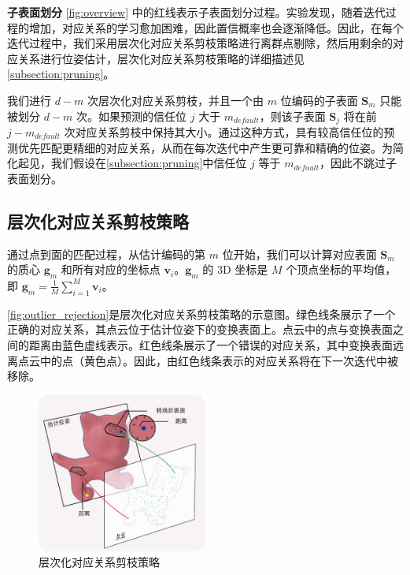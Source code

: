 \textbf{子表面划分} \autoref{fig:overview} 中的红线表示子表面划分过程。实验发现，随着迭代过程的增加，对应关系的学习愈加困难，因此置信概率也会逐渐降低。因此，在每个迭代过程中，我们采用层次化对应关系剪枝策略进行离群点剔除，然后用剩余的对应关系进行位姿估计，层次化对应关系剪枝策略的详细描述见\autoref{subsection:pruning}。

我们进行 $d - m$ 次层次化对应关系剪枝，并且一个由 $m$ 位编码的子表面 $\mathbf{S}_m$ 只能被划分 $d - m$ 次。如果预测的信任位 $j$ 大于 $m_{default}$，则该子表面 $\mathbf{S}_j$ 将在前 $j - m_{default}$ 次对应关系剪枝中保持其大小。通过这种方式，具有较高信任位的预测优先匹配更精细的对应关系，从而在每次迭代中产生更可靠和精确的位姿。为简化起见，我们假设在\autoref{subsection:pruning}中信任位 $j$ 等于 $m_{default}$，因此不跳过子表面划分。

\subsection{层次化对应关系剪枝策略}\label{subsection:pruning}

通过点到面的匹配过程，从估计编码的第 $m$ 位开始，我们可以计算对应表面 $\mathbf{S}_{m}$ 的质心 $\mathbf{g}_{m}$ 和所有对应的坐标点 $\mathbf{v}_i$。$\mathbf{g}_{m}$ 的 3D 坐标是 $M$ 个顶点坐标的平均值，即 $\mathbf{g}_m = \frac{1}{M}\sum_{i=1}^{M}\mathbf{v}_i$。


\autoref{fig:outlier_rejection}是层次化对应关系剪枝策略的示意图。绿色线条展示了一个正确的对应关系，其点云位于估计位姿下的变换表面上。点云中的点与变换表面之间的距离由蓝色虚线表示。红色线条展示了一个错误的对应关系，其中变换表面远离点云中的点（黄色点）。因此，由红色线条表示的对应关系将在下一次迭代中被移除。

\begin{figure}[htbp]
    \centering
    \includegraphics[width=0.5\textwidth]{figure/hipose/outlier_rejection.pdf}
    \caption{层次化对应关系剪枝策略}
    \label{fig:outlier_rejection}
\end{figure}

